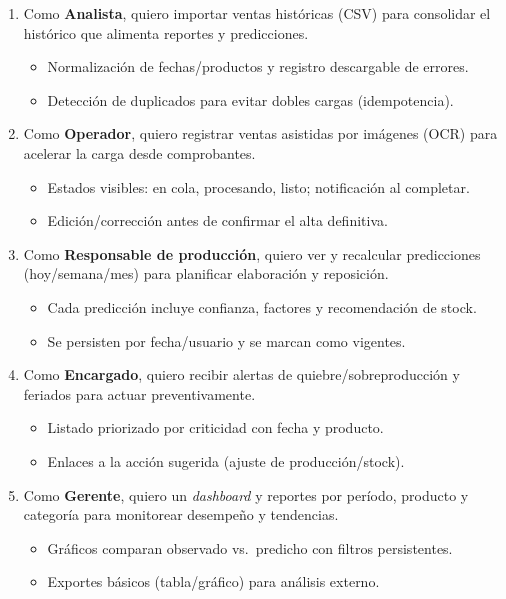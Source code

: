 \begin{enumerate}[label=HU-\arabic*., leftmargin=*, nosep]
\item Como \textbf{Analista}, quiero importar ventas históricas (CSV) para consolidar el histórico que alimenta reportes y predicciones.
\begin{itemize}[nosep]
\item Normalización de fechas/productos y registro descargable de errores.
\item Detección de duplicados para evitar dobles cargas (idempotencia).
\end{itemize}

\item Como \textbf{Operador}, quiero registrar ventas asistidas por imágenes (OCR) para acelerar la carga desde comprobantes.
\begin{itemize}[nosep]
\item Estados visibles: en cola, procesando, listo; notificación al completar.
\item Edición/corrección antes de confirmar el alta definitiva.
\end{itemize}

\item Como \textbf{Responsable de producción}, quiero ver y recalcular predicciones (hoy/semana/mes) para planificar elaboración y reposición.
\begin{itemize}[nosep]
\item Cada predicción incluye confianza, factores y recomendación de stock.
\item Se persisten por fecha/usuario y se marcan como vigentes.
\end{itemize}

\item Como \textbf{Encargado}, quiero recibir alertas de quiebre/sobreproducción y feriados para actuar preventivamente.
\begin{itemize}[nosep]
\item Listado priorizado por criticidad con fecha y producto.
\item Enlaces a la acción sugerida (ajuste de producción/stock).
\end{itemize}

\item Como \textbf{Gerente}, quiero un \textit{dashboard} y reportes por período, producto y categoría para monitorear desempeño y tendencias.
\begin{itemize}[nosep]
\item Gráficos comparan observado vs.\ predicho con filtros persistentes.
\item Exportes básicos (tabla/gráfico) para análisis externo.
\end{itemize}


\end{enumerate}
